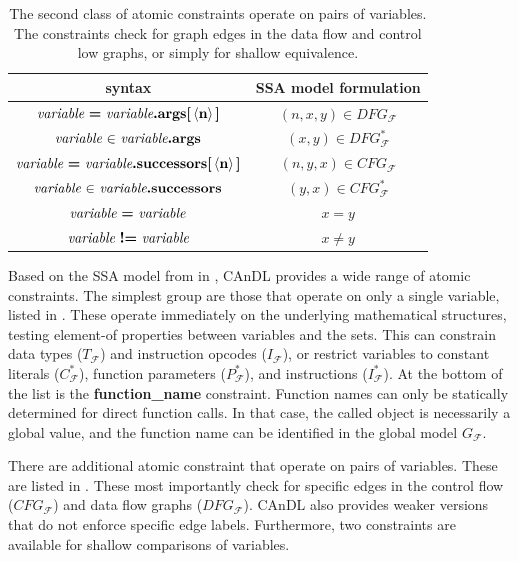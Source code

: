 \begin{table}[t]
  \centering
  \begin{tabular}{|c|c|}
    \hline
    syntax & SSA model formulation \\
    \hline
    \hline
    $\text{\it variable}\ \text{\bf =}\ \text{\it variable}\text{\bf.args[}\left<\text{\bf n}\right>\text{\bf]}$ & $(n,x,y)\in DFG_\mathcal F$\\
    $\text{\it variable}\ \text{\bf $\in$}\ \text{\it variable}\text{\bf .args}$ & $(x,y)\in DFG_\mathcal F^*$\\
    \hline
    $\text{\it variable}\ \text{\bf =}\ \text{\it variable}\text{\bf.successors[}\left<\text{\bf n}\right>\text{\bf]}$ & $(n,y,x)\in CFG_\mathcal F$\\
    $\text{\it variable}\ \text{\bf $\in$}\ \text{\it variable}\text{\bf .successors}$ & $(y,x)\in CFG_\mathcal F^*$\\
    \hline
    $\text{\it variable}\ \text{\bf =}\ \text{\it variable}$ & $x=y$\\
    $\text{\it variable}\ \text{\bf !=}\ \text{\it variable}$ & $x\neq y$\\
    \hline
  \end{tabular}
  \caption{The second class of atomic constraints operate on pairs of variables.
           The constraints check for graph edges in the
           data flow and control low graphs, or simply for shallow equivalence.}
  \label{twovaratomics}
\end{table}

    Based on the SSA model from  in ,
    CAnDL provides a wide range of atomic constraints.
    The simplest group are those that operate on only a single variable,
    listed in .
    These operate immediately on the underlying mathematical structures, testing
    element-of properties between variables and the sets.
    This can constrain data types ($T_\mathcal{F}$) and 
    instruction opcodes ($I_\mathcal{F}$), or 
    restrict variables to constant literals ($C_\mathcal{F}^*$), function
    parameters ($P_\mathcal{F}^*$), and instructions ($I_\mathcal{F}^*$).
    At the bottom of the list is the {\bf function\_name} constraint.
    Function names can only be statically determined for direct function calls.
    In that case, the called object is necessarily a global value, and the
    function name can be identified in the global model $G_\mathcal F$.

    There are additional atomic constraint that operate on pairs of variables.
    These are listed in .
    These most importantly check for specific edges in the control flow
    ($CFG_\mathcal F$) and data flow graphs ($DFG_\mathcal F$).
    CAnDL also provides weaker versions that do not enforce specific edge
    labels.
    Furthermore, two constraints are available for shallow comparisons of
    variables.


